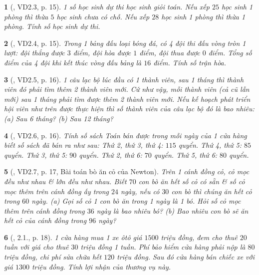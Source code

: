 \documentclass{article}
\newtheorem{baitoan}{}
\begin{document}
\begin{baitoan}[\cite{TLCT_THCS_Toan_6_so_hoc}, VD2.3, p. 15]
	1 số học sinh dự thi học sinh giỏi toán. Nếu xếp $25$ học sinh 1 phòng thì thừa $5$ học sinh chưa có chỗ. Nếu xếp $28$ học sinh 1 phòng thì thừa 1 phòng. Tính số học sinh dự thi.
\end{baitoan}

\begin{baitoan}[\cite{TLCT_THCS_Toan_6_so_hoc}, VD2.4, p. 15]
	Trong 1 bảng đấu loại bóng đá, có 4 đội thi đấu vòng tròn 1 lượt: đội thắng được $3$ điểm, đội hòa được $1$ điểm, đội thua được $0$ điểm. Tổng số điểm của 4 đội khi kết thúc vòng đấu bảng là $16$ điểm. Tính số trận hòa.
\end{baitoan}

\begin{baitoan}[\cite{TLCT_THCS_Toan_6_so_hoc}, VD2.5, p. 16]
	1 câu lạc bộ lúc đầu có 1 thành viên, sau 1 tháng thì thành viên đó phải tìm thêm 2 thành viên mới. Cứ như vậy, mỗi thành viên (cả cũ lẫn mới) sau 1 tháng phải tìm được thêm 2 thành viên mới. Nếu kế hoạch phát triển hội viên như trên được thực hiện thì số thành viên của câu lạc bộ đó là bao nhiêu: (a) Sau 6 tháng? (b) Sau 12 tháng?
\end{baitoan}

\begin{baitoan}[\cite{TLCT_THCS_Toan_6_so_hoc}, VD2.6, p. 16]
	Tính số sách Toán bán được trong mỗi ngày của 1 cửa hàng biết số sách đã bán ra như sau: Thứ 2, thứ 3, thứ 4: $115$ quyển. Thứ 4, thứ 5: $85$ quyển. Thứ 3, thứ 5: $90$ quyển. Thứ 2, thứ 6: $70$ quyển. Thứ 5, thứ 6: $80$ quyển.
\end{baitoan}

\begin{baitoan}[\cite{TLCT_THCS_Toan_6_so_hoc}, VD2.7, p. 17, Bài toán bò ăn cỏ của Newton]
	Trên 1 cánh đồng cỏ, cỏ mọc đều như nhau \& lớn đều như nhau. Biết $70$ con bò ăn hết số cỏ có sẵn \& số cỏ mọc thêm trên cánh đồng ấy trong $24$ ngày, nếu có $30$ con bò thì chúng ăn hết cỏ trong $60$ ngày. (a) Gọi số cỏ 1 con bò ăn trong 1 ngày là 1 bó. Hỏi số cỏ mọc thêm trên cánh đồng trong $36$ ngày là bao nhiêu bó? (b) Bao nhiêu con bò sẽ ăn hết cỏ của cánh đồng trong $96$ ngày?
\end{baitoan}

\begin{baitoan}[\cite{TLCT_THCS_Toan_6_so_hoc}, 2.1., p. 18]
	1 cửa hàng mua 1 xe ôtô giá $1500$ triệu đồng, đem cho thuê $20$ tuần với giá cho thuê $30$ triệu đồng 1 tuần. Phí bảo hiểm cửa hàng phải nộp là $80$ triệu đồng, chi phí sửa chữa hết $120$ triệu đồng. Sau đó cửa hàng bán chiếc xe với giá $1300$ triệu đồng. Tính lợi nhận của thương vụ này.
\end{baitoan}
\end{document}
